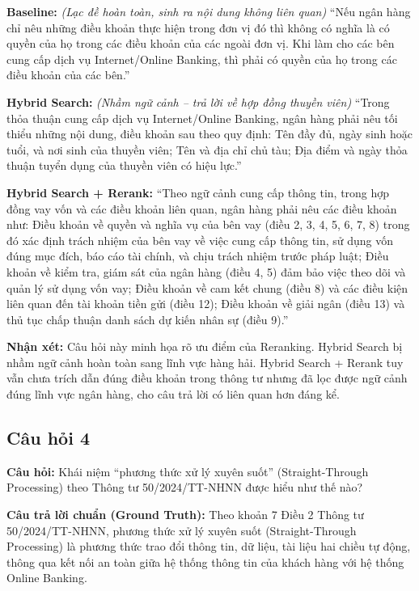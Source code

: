 \textbf{Baseline:} \textit{(Lạc đề hoàn toàn, sinh ra nội dung không liên quan)} ``Nếu ngân hàng chỉ nêu những điều khoản thực hiện trong đơn vị đó thì không có nghĩa là có quyền của họ trong các điều khoản của các ngoài đơn vị. Khi làm cho các bên cung cấp dịch vụ Internet/Online Banking, thì phải có quyền của họ trong các điều khoản của các bên.''

\textbf{Hybrid Search:} \textit{(Nhầm ngữ cảnh -- trả lời về hợp đồng thuyền viên)} ``Trong thỏa thuận cung cấp dịch vụ Internet/Online Banking, ngân hàng phải nêu tối thiểu những nội dung, điều khoản sau theo quy định: Tên đầy đủ, ngày sinh hoặc tuổi, và nơi sinh của thuyền viên; Tên và địa chỉ chủ tàu; Địa điểm và ngày thỏa thuận tuyển dụng của thuyền viên có hiệu lực.''

\textbf{Hybrid Search + Rerank:} ``Theo ngữ cảnh cung cấp thông tin, trong hợp đồng vay vốn và các điều khoản liên quan, ngân hàng phải nêu các điều khoản như: Điều khoản về quyền và nghĩa vụ của bên vay (điều 2, 3, 4, 5, 6, 7, 8) trong đó xác định trách nhiệm của bên vay về việc cung cấp thông tin, sử dụng vốn đúng mục đích, báo cáo tài chính, và chịu trách nhiệm trước pháp luật; Điều khoản về kiểm tra, giám sát của ngân hàng (điều 4, 5) đảm bảo việc theo dõi và quản lý sử dụng vốn vay; Điều khoản về cam kết chung (điều 8) và các điều kiện liên quan đến tài khoản tiền gửi (điều 12); Điều khoản về giải ngân (điều 13) và thủ tục chấp thuận danh sách dự kiến nhân sự (điều 9).''

\textbf{Nhận xét:} Câu hỏi này minh họa rõ ưu điểm của Reranking. Hybrid Search bị nhầm ngữ cảnh hoàn toàn sang lĩnh vực hàng hải. Hybrid Search + Rerank tuy vẫn chưa trích dẫn đúng điều khoản trong thông tư nhưng đã lọc được ngữ cảnh đúng lĩnh vực ngân hàng, cho câu trả lời có liên quan hơn đáng kể.

\subsection*{Câu hỏi 4}

\textbf{Câu hỏi:} Khái niệm ``phương thức xử lý xuyên suốt'' (Straight-Through Processing) theo Thông tư 50/2024/TT-NHNN được hiểu như thế nào?

\textbf{Câu trả lời chuẩn (Ground Truth):} Theo khoản 7 Điều 2 Thông tư 50/2024/TT-NHNN, phương thức xử lý xuyên suốt (Straight-Through Processing) là phương thức trao đổi thông tin, dữ liệu, tài liệu hai chiều tự động, thông qua kết nối an toàn giữa hệ thống thông tin của khách hàng với hệ thống Online Banking.

